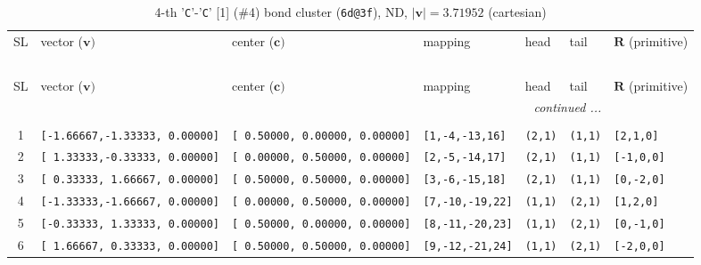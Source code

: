 \documentclass[fleqn,10pt,landscape]{jsarticle}
\begin{document}
\begin{longtable}[l]{cllllll}
\captionsetup{justification=raggedright, singlelinecheck=off}
\caption{4-th '\texttt{C}'-'\texttt{C}' [1] (\#4) bond cluster (\texttt{6d@3f}), ND, $|\bm{v}|=3.71952$ (cartesian)}
 \\
 \hline \hline
SL & vector ($\bm{v})$ & center ($\bm{c})$ & mapping & head & tail & $\bm{R}$ (primitive) \\ \hline \endfirsthead

\multicolumn{6}{l}{\tablename\ \thetable{}} \\
 \hline \hline
SL & vector ($\bm{v})$ & center ($\bm{c})$ & mapping & head & tail & $\bm{R}$ (primitive) \\ \hline \endhead

 \hline \hline
\multicolumn{6}{r}{\footnotesize\it continued ...} \\ \endfoot

 \hline \hline
\multicolumn{6}{r}{} \\ \endlastfoot

1 & \texttt{[-1.66667,-1.33333, 0.00000]} & \texttt{[ 0.50000, 0.00000, 0.00000]} & \texttt{[1,-4,-13,16]} & \texttt{(2,1)} & \texttt{(1,1)} & \texttt{[2,1,0]} \\ \hline
2 & \texttt{[ 1.33333,-0.33333, 0.00000]} & \texttt{[ 0.00000, 0.50000, 0.00000]} & \texttt{[2,-5,-14,17]} & \texttt{(2,1)} & \texttt{(1,1)} & \texttt{[-1,0,0]} \\ \hline
3 & \texttt{[ 0.33333, 1.66667, 0.00000]} & \texttt{[ 0.50000, 0.50000, 0.00000]} & \texttt{[3,-6,-15,18]} & \texttt{(2,1)} & \texttt{(1,1)} & \texttt{[0,-2,0]} \\ \hline
4 & \texttt{[-1.33333,-1.66667, 0.00000]} & \texttt{[ 0.00000, 0.50000, 0.00000]} & \texttt{[7,-10,-19,22]} & \texttt{(1,1)} & \texttt{(2,1)} & \texttt{[1,2,0]} \\ \hline
5 & \texttt{[-0.33333, 1.33333, 0.00000]} & \texttt{[ 0.50000, 0.00000, 0.00000]} & \texttt{[8,-11,-20,23]} & \texttt{(1,1)} & \texttt{(2,1)} & \texttt{[0,-1,0]} \\ \hline
6 & \texttt{[ 1.66667, 0.33333, 0.00000]} & \texttt{[ 0.50000, 0.50000, 0.00000]} & \texttt{[9,-12,-21,24]} & \texttt{(1,1)} & \texttt{(2,1)} & \texttt{[-2,0,0]} \\
\end{longtable}
\renewcommand{\arraystretch}{1.6}
\end{document}
